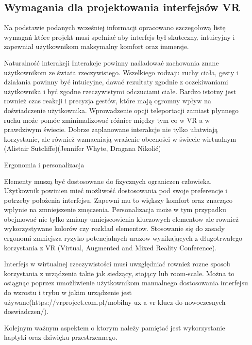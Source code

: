 \subsection{Wymagania dla projektowania interfejsów VR}

Na podstawie podanych wcześniej informacji opracowano szczegołową listę wymagań które projekt musi spełniać aby interfejs był skuteczny, intuicyjny i zapewniał użytkownikom maksymalny komfort oraz immersje. 

Naturalność interakcji
Interakcje powinny naśladować  zachowania znane użytkownikom ze świata rzeczywistego. Wszelkiego rodzaju ruchy ciała, gesty i działania powinny być intuicyjne, dawać rezultaty zgodnie z oczekiwaniami użytkownika i być zgodne rzeczywistymi odczuciami ciałe. Bardzo istotny jest rownież czas reakcji i precyzja gestów, które mają ogromny wpływ na doświadczenie użytkownika. Wprowadzenie opcji teleportacji zamiast płynnego ruchu może pomóc zminimalizować różnice między tym co w VR a w prawdziwym świecie. Dobrze zaplanowane interakcje nie tylko ułatwiają korzystanie, ale również wzmacniają wrażenie obecności w świecie wirtualnym (Alistair Sutcliffe)(Jennifer Whyte, Dragana Nikolić)



Ergonomia i personalizacja

Elementy muszą być dostosowane do fizycznych ograniczen człowieka. Użytkownik powinien mieć możliwość dostosowania pod swoje preferencje i potrzeby położenia interfejsu.  Zapewni mu to większy komfort oraz znacząco wpłynie na zmniejszenie zmęczenia. Personalizacja może w tym przypadku obejmować nie tylko zmiany umiejscowienia kluczowych elementow ale rownież wykorzystywane kolorów czy rozkład elementow. Stosowanie się do zasady ergonomi zmniejsza ryzyko potencjalnych urazow wynikających z długotrwałego korzystania z VR (Virtual, Augmented and Mixed Reality Conference). 

Interfejs w wirtualnej rzeczywistości musi uwzględniać rownież rozne sposob korzystania z urządzenia takie jak siedzący, stojący lub room-scale. Można to osiągnąc poprzez umożliwienie użytkownikom manualnego dostosowania interfejsu do wzrostu i trybu w jakim urządzenie jest używane(https://vrproject.com.pl/mobilny-ux-a-vr-klucz-do-nowoczesnych-doswiadczen/).

Kolejnym ważnym aspektem o ktorym należy pamiętać jest wykorzystanie haptyki oraz dziwięku przestrzennego. 





